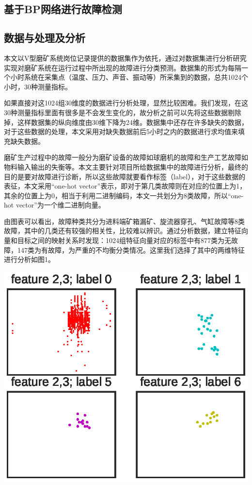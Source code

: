 \documentclass{ctacn}%
\begin{document}
\begin{multicols}{2}


\section{基于BP网络进行故障检测}

\subsection{数据与处理及分析}
本文以V型磨矿系统岗位记录提供的数据集作为依托，通过对数据集进行分析研究实现对磨矿系统在运行过程中所出现的故障进行分类预测。数据集的形式为每隔一个小时系统在采集点（温度、压力、声音、振动等）所采集到的数据，总共1024个小时，30种测量指标。

如果直接对这1024组30维度的数据进行分析处理，显然比较困难。我们发现，在这30种测量指标里面有很多是不会发生变化的，故分析之前可以先将这些数据剔除掉，这样数据集的纵向维度由30维下降为24维。数据集中还存在许多缺失的数据，对于这些数据的处理，本文采用对缺失数据前后5小时之内的数据进行求均值来填充缺失数据。

磨矿生产过程中的故障一般分为磨矿设备的故障如球磨机的故障和生产工艺故障如物料输入输出的失衡等。本文主要针对项目所给数据集中的故障进行分析，最终的目的是要对故障进行诊断，所以这些故障就要看作标签（label），对于这些数据的表征，本文采用“one-hot vector”表示，即对于第几类故障则在对应的位置上为1，其余的位置上为0，相当于利用二进制编码，本文一共划分为8类故障，所以“one-hot vector”为一个维二进制向量。


由图表可以看出，故障种类共分为进料端矿箱漏矿、旋流器穿孔、气缸故障等8类故障，其中的几类还有较强的相关性，比较难以辨识。通过分析数据，建立特征向量和目标之间的映射关系时发现：1024组特征向量对应的标签中有877类为无故障，147类为有故障，为严重的不均衡分类情况。这里我们选择了其中的两维特征进行分析如图1。
\begin{center}
	\includegraphics[scale=0.7, trim=0 0 0 0]{figs/data_features}\\
	\label{fig1}
\end{center}


\end{multicols}
\end{document}
